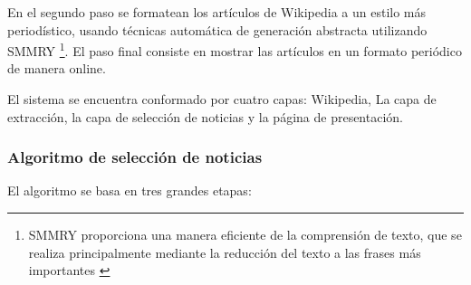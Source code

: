 En el segundo paso se formatean los artículos de Wikipedia a un estilo más periodístico, usando técnicas automática de generación abstracta utilizando SMMRY \footnote{  SMMRY proporciona una manera eficiente de la comprensión de texto, que se realiza principalmente mediante la reducción del texto a las frases más importantes \cite{smmry}}. El paso final consiste en mostrar las artículos en un formato periódico de manera online.

El sistema se encuentra conformado por cuatro capas: Wikipedia, La capa de extracción, la capa de selección de noticias y la página de presentación.\\

\subsubsection{Algoritmo de selección de noticias} 

El algoritmo se basa en tres grandes etapas: 

